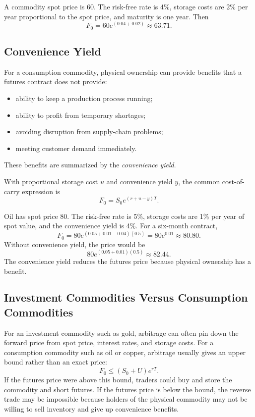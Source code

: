 \begin{exmp}
A commodity spot price is 60. The risk-free rate is 4\%, storage costs are 2\%
per year proportional to the spot price, and maturity is one year. Then
\[
    F_0=60e^{(0.04+0.02)}\approx 63.71.
\]
\end{exmp}

\subsection{Convenience Yield}

For a consumption commodity, physical ownership can provide benefits that a
futures contract does not provide:
\begin{itemize}
    \item ability to keep a production process running;
    \item ability to profit from temporary shortages;
    \item avoiding disruption from supply-chain problems;
    \item meeting customer demand immediately.
\end{itemize}
These benefits are summarized by the \emph{convenience yield}.

With proportional storage cost $u$ and convenience yield $y$, the common
cost-of-carry expression is
\[
    F_0=S_0e^{(r+u-y)T}.
\]

\begin{exmp}
Oil has spot price 80. The risk-free rate is 5\%, storage costs are 1\% per year
of spot value, and the convenience yield is 4\%. For a six-month contract,
\[
    F_0=80e^{(0.05+0.01-0.04)(0.5)}
    =
    80e^{0.01}
    \approx 80.80.
\]
Without convenience yield, the price would be
\[
    80e^{(0.05+0.01)(0.5)}\approx 82.44.
\]
The convenience yield reduces the futures price because physical ownership has a
benefit.
\end{exmp}

\subsection{Investment Commodities Versus Consumption Commodities}

For an investment commodity such as gold, arbitrage can often pin down the
forward price from spot price, interest rates, and storage costs. For a
consumption commodity such as oil or copper, arbitrage usually gives an upper
bound rather than an exact price:
\[
    F_0\leq (S_0+U)e^{rT}.
\]
If the futures price were above this bound, traders could buy and store the
commodity and short futures. If the futures price is below the bound, the
reverse trade may be impossible because holders of the physical commodity may
not be willing to sell inventory and give up convenience benefits.

